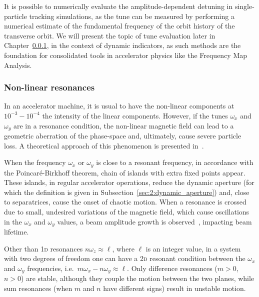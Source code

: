 It is possible to numerically evaluate the amplitude-dependent detuning in single-particle tracking simulations, as the tune can be measured by performing a numerical estimate of the fundamental frequency of the orbit history of the transverse orbit. We will present the topic of tune evaluation later in Chapter~\ref{}, in the context of dynamic indicators, as such methods are the foundation for consolidated tools in accelerator physics like the Frequency Map Analysis.

\subsubsection{Non-linear resonances}

In an accelerator machine, it is usual to have the non-linear components at $10^{-3} - 10^{-4}$ the intensity of the linear components. However, if the tunes $\omega_x$ and $\omega_y$ are in a resonance condition, the non-linear magnetic field can lead to a geometric aberration of the phase-space and, ultimately, cause severe particle loss. A theoretical approach of this phenomenon is presented in~\cite{wilson}.

When the frequency $\omega_x$ or $\omega_y$ is close to a resonant frequency, in accordance with the Poincaré-Birkhoff theorem, chain of islands with extra fixed points appear. These islands, in regular accelerator operations, reduce the dynamic aperture (for which the definition is given in Subsection~\ref{sec:2:dynamic_aperture}) and, close to separatrices, cause the onset of chaotic motion. When a resonance is crossed due to small, undesired variations of the magnetic field, which cause oscillations in the $\omega_x$ and $\omega_y$ values, a beam amplitude growth is observed~\cite{Guignard:185921}, impacting beam lifetime.

Other than 1\textsc{d} resonances $n\omega_z \approx \ell$, where $\ell$ is an integer value, in a system with two degrees of freedom one can have a 2\textsc{d} resonant condition between the $\omega_x$ and $\omega_y$ frequencies, i.e.\ $m\omega_x-n\omega_y\approx \ell$. Only difference resonances ($m>0$, $n>0$) are stable, although they couple the motion between the two planes, while sum resonances (when $m$ and $n$ have different signs) result in unstable motion.

